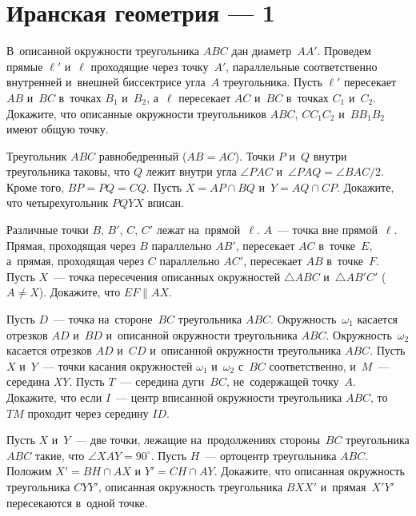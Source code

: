 
\section*{Иранская геометрия --- 1}


\begin{problems}

\item
В~описанной окружности треугольника $ABC$ дан диаметр~$AA'$.
Проведем прямые $\ell'$ и~$\ell$ проходящие через точку~$A'$,
параллельные соответственно внутренней и~внешней биссектрисе угла~$A$
треугольника.
Пусть $\ell'$ пересекает $AB$ и~$BC$ в~точках $B_1$ и~$B_2$, а~$\ell$
пересекает $AC$ и~$BC$ в~точках $C_1$ и~$C_2$.
Докажите, что описанные окружности треугольников $ABC$, $C C_1 C_2$
и~$B B_1 B_2$ имеют общую точку.

\item
Треугольник $ABC$ равнобедренный ($AB = AC$).
Точки $P$ и~$Q$ внутри треугольника таковы, что $Q$ лежит внутри
угла $\angle PAC$ и~$\angle PAQ = \angle BAC / 2$.
Кроме того, $BP = PQ = CQ$.
Пусть $X = AP \cap BQ$ и~$Y = AQ \cap CP$.
Докажите, что четырехугольник $PQYX$ вписан.

\item
Различные точки $B$, $B'$, $C$, $C'$ лежат на~прямой~$\ell$.
$A$~--- точка вне прямой~$\ell$.
Прямая, проходящая через $B$ параллельно $AB'$, пересекает $AC$ в~точке~$E$,
а~прямая, проходящая через $C$ параллельно $AC'$, пересекает $AB$ в~точке~$F$.
Пусть $X$~--- точка пересечения описанных окружностей $\triangle ABC$
и~$\triangle AB'C'$ ($A \neq X$).
Докажите, что $EF \parallel AX$.

\item
Пусть $D$~--- точка на~стороне~$BC$ треугольника $ABC$.
Окружность~$\omega_1$ касается отрезков $AD$ и~$BD$ и~описанной окружности
треугольника $ABC$.
Окружность~$\omega_2$ касается отрезков $AD$ и~$CD$ и~описанной окружности
треугольника $ABC$.
Пусть $X$ и~$Y$~--- точки касания окружностей $\omega_1$ и~$\omega_2$ с~$BC$
соответственно, и~$M$~--- середина $XY$.
Пусть $T$~--- середина дуги~$BC$, не~содержащей точку~$A$.
Докажите, что если $I$~--- центр вписанной окружности треугольника
$ABC$, то~$TM$ проходит через середину $ID$.

\item
Пусть $X$ и~$Y$~--- две точки, лежащие на~продолжениях стороны~$BC$
треугольника $ABC$ такие, что $\angle XAY = 90^\circ$.
Пусть $H$~--- ортоцентр треугольника $ABC$.
Положим $X' = BH \cap AX$ и $Y' = CH \cap AY$.
Докажите, что описанная окружность треугольника $CYY'$, описанная окружность
треугольника $BXX'$ и~прямая~$X'Y'$ пересекаются в~одной точке.


\end{problems}
